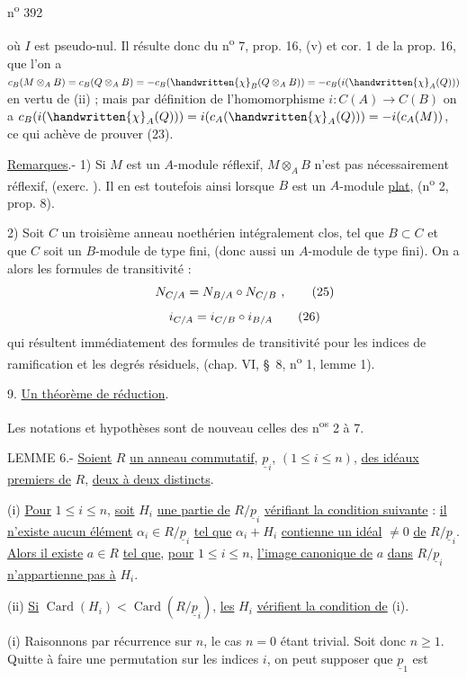 n\textsuperscript{o} 392

où $I$ est pseudo-nul. Il résulte donc du n\textsuperscript{o} 7, prop. 16, (v) et cor. 1 de la prop. 16, que l'on a $c_B(M\otimes_A B)=c_B(Q\otimes_A B)=-c_B(\handwritten{\chi}_B(Q\otimes_A B))=-c_B(i(\handwritten{\chi}_A(Q)))$ en vertu de (ii) ; mais par définition de l'homomorphisme $i:C(A)\longrightarrow C(B)$ on a $c_B(i(\handwritten{\chi}_A(Q)))=i(c_A(\handwritten{\chi}_A(Q)))=-i(c_A(M))$, ce qui achève de prouver (23).

\uline{Remarques}.- 1) Si $M$ est un $A$-module réflexif, $M\otimes_A B$ n'est pas nécessairement réflexif, (exerc. \quad). Il en est toutefois ainsi lorsque $B$ est un $A$-module \uline{plat}, (n\textsuperscript{o} 2, prop. 8).

2) Soit $C$ un troisième anneau noethérien intégralement clos, tel que $B\subset C$ et que $C$ soit un $B$-module de type fini, (donc aussi un $A$-module de type fini). On a alors les formules de transitivité :
\[
N_{C/A}=N_{B/A}\circ N_{C/B}\ ,\tag*{\makebox[0pt][r]{\makebox[\displaywidth][l]{(25)}}}
\]
\[
i_{C/A}=i_{C/B}\circ i_{B/A}\tag*{\makebox[0pt][r]{\makebox[\displaywidth][l]{(26)}}}
\]
qui résultent immédiatement des formules de transitivité pour les indices de ramification et les degrés résiduels, (chap. VI, \S~8, n\textsuperscript{o} 1, lemme 1).

9. \uline{Un théorème de réduction}.

Les notations et hypothèses sont de nouveau celles des n\textsuperscript{os} 2 à 7.

LEMME 6.- \uline{Soient} $R$ \uline{un anneau commutatif}, $\underline p_i$, $(1\leq i\leq n)$, \uline{des idéaux premiers de} $R$, \uline{deux à deux distincts}.

(i) \uline{Pour} $1\leq i\leq n$, \uline{soit} $H_i$ \uline{une partie de} $R/\underline p_i$ \uline{vérifiant la condition suivante} : \uline{il n'existe aucun élément} $\alpha_i\in R/\underline p_i$ \uline{tel que} $\alpha_i+H_i$ \uline{contienne un idéal} $\neq 0$ \uline{de} $R/\underline p_i$. \uline{Alors il existe} $a\in R$ \uline{tel que}, \uline{pour} $1\leq i\leq n$, \uline{l'image canonique de} $a$ \uline{dans} $R/\underline p_i$ \uline{n'appartienne pas à} $H_i$.

(ii) \uline{Si} $\operatorname{Card}(H_i)<\operatorname{Card}(R/\underline p_i)$, \uline{les} $H_i$ \uline{vérifient la condition de} (i).

(i) Raisonnons par récurrence sur $n$, le cas $n=0$ étant trivial. Soit donc $n\geq 1$. Quitte à faire une permutation sur les indices $i$, on peut supposer que $\underline p_1$ est
